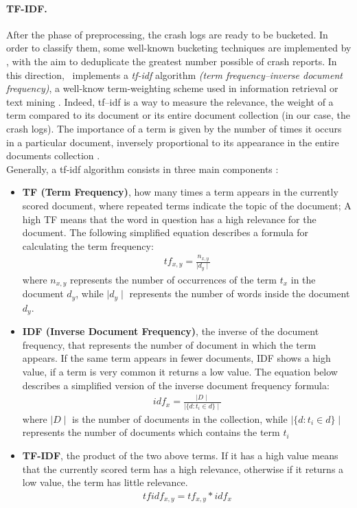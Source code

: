 \paragraph{TF-IDF.} After the phase of preprocessing, the crash logs are ready to be bucketed. In order to classify them, some well-known bucketing techniques are implemented by \toolname, with the aim to deduplicate the greatest number possible of crash reports.
In this direction, \toolname\ implements a \textit{tf-idf} algorithm \textit{(term frequency–inverse document frequency)}, a well-know term-weighting scheme used in information retrieval or text mining \cite{tfidf}. Indeed, tf–idf is a way to measure the relevance, the weight of a term compared to its document or its entire document collection (in our case, the crash logs). The importance of a term is given by the number of times it occurs in a particular document, inversely proportional to its appearance in the entire documents collection \cite{campbell}.  \\
Generally, a tf-idf algorithm consists in three main components \cite{tfidfsimilarity}: 
\begin{itemize}
\item \textbf{TF (Term Frequency)}, \ie how many times a term appears in the currently scored document, where repeated terms indicate the topic of the document; A high TF means that the word in question has a high relevance for the document. The following simplified equation \cite{tfidf} describes a formula for calculating the term frequency:
\begin{align*}
tf_{x,y} = \frac{n_{x,y}}{\mid d_{y} \mid}
\end{align*}
where $n_{x,y}$ represents the number of occurrences of the term $t_x$ in the document $d_{y}$, while $\mid d_{y} \mid$ represents the number of words inside the document $d_{y}$.

\item \textbf{IDF (Inverse Document Frequency)}, \ie the inverse of the document frequency, that represents the number of document in which the term appears. If the same term appears in fewer documents, IDF shows a high value, if a term is very common it returns a low value. 
The equation \cite{tfidf} below describes a simplified version of the inverse document frequency formula: 
\begin{align*}
idf_{x} = \frac{\mid D \mid}{\mid \{d: t_{i} \in d\} \mid}
\end{align*}
where $\mid D \mid$ is the number of documents in the collection, while $\mid \{d: t_{i} \in d\} \mid$ represents the number of documents which contains the term $t_i$

\item \textbf{TF-IDF}, \ie the product of the two above terms. If it has a high value means that the currently scored term has a high relevance, otherwise if it returns a low value, the term has little relevance.
\begin{align*}
tfidf_{x,y} = tf_{x,y}*idf_{x}
\end{align*}

\end{itemize}
